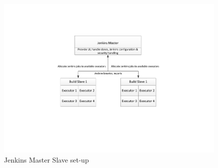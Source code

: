 \documentclass[12pt, a4paper, titlepage]{scrartcl}
\begin{document}
\begin{figure}[!htp]
\hspace{-1cm}
	\includegraphics[scale=0.6, trim=0cm 6cm 5cm 5cm]{Jenkins-Master-Slave.pdf}
\caption{Jenkins Master Slave set-up}
\label{fig:jenkins-master-slave}
\end{figure}
\end{document}
